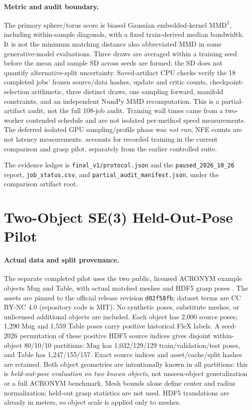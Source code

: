 \paragraph{Metric and audit boundary.}
The primary sphere/torus score is biased Gaussian embedded-kernel
$\mathrm{MMD}^2$, including within-sample diagonals, with a fixed train-derived
median bandwidth. It is not the minimum matching distance also abbreviated
MMD in some generative-model evaluations. Three draws are averaged within a
training seed before the mean and sample SD across seeds are formed; the SD
does not quantify alternative-split uncertainty. Saved-artifact CPU checks
verify the 18 completed jobs' frozen source/data hashes, update and critic
counts, checkpoint-selection arithmetic, three distinct draws, one sampling
forward, manifold constraints, and an independent NumPy MMD recomputation.
This is a partial-artifact audit, not the full 108-job audit. Training wall
times came from a two-worker contended schedule and are not isolated
per-method speed measurements. The deferred isolated GPU sampling/profile
phase was \emph{not run}; NFE counts are not latency measurements.
 accounts for recorded training in the current
comparison and grasp pilot, separately from the earlier controlled suite.

The evidence ledger is \texttt{final\_v1/protocol.json} and the
\texttt{paused\_2026\_10\_26} report, \texttt{job\_status.csv}, and
\texttt{partial\_audit\_manifest.json}, under the comparison artifact root.

\section{Two-Object SE(3) Held-Out-Pose Pilot}
\label{app:grasp-protocol}

\paragraph{Actual data and split provenance.}
The separate completed pilot uses the two public, licensed ACRONYM example
objects Mug and Table, with actual matched meshes and HDF5 grasp poses
\citep{eppner2021acronym}. The assets are pinned to the official release
revision \texttt{d02f58fb}; dataset terms are CC BY-NC 4.0 (repository code is
MIT). No synthetic poses, substitute meshes, or unlicensed additional objects
are included. Each object has 2,000 source poses; 1,290 Mug and 1,559 Table
poses carry positive historical FleX labels. A seed-2026 permutation of these
positive HDF5 source indices gives disjoint within-object 80/10/10 partitions:
Mug has 1,032/129/129 train/validation/test poses, and Table has
1,247/155/157. Exact source indices and asset/cache/split hashes are retained.
Both object geometries are intentionally known in all partitions: this is
\emph{held-out-pose evaluation on two known objects}, not unseen-object
generalization or a full ACRONYM benchmark. Mesh bounds alone define center
and radius normalization; held-out grasp statistics are not used. HDF5
translations are already in meters, so object scale is applied only to meshes.

